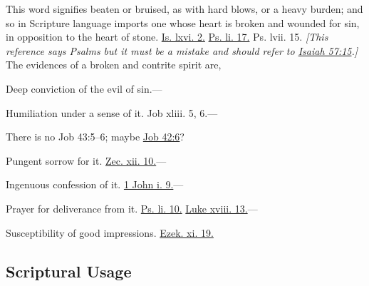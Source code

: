 	\begin{compactdesc}
		\item[250] This word signifies beaten or bruised, as with hard blows, or a heavy burden; and so in Scripture language imports one whose heart is broken and wounded for sin, in opposition to the heart of stone. \hyperref[ISAIAH-66-2]{Is. lxvi. 2.} \hyperref[PSALMS-51-17]{Ps. li. 17.} Ps. lvii. 15. \textit{[This reference says Psalms but it must be a mistake and should refer to \hyperref[ISAIAH-57-15]{Isaiah 57:15}.]} The evidences of a broken and contrite spirit are,
			\begin{compactitem}
				\item Deep conviction of the evil of sin.---
				\item Humiliation under a sense of it. Job xliii. 5, 6.---
					\begin{compactitem}
						\item There is no Job 43:5--6; maybe \hyperref[JOB-42-6]{Job 42:6}?
					\end{compactitem}
				\item Pungent sorrow for it. \hyperref[ZECHARIAH-12-10]{Zec. xii. 10.}---
				\item Ingenuous confession of it. \hyperref[1JOHN-1-9]{1 John i. 9.}---
				\item Prayer for deliverance from it. \hyperref[PSALMS-51-10]{Ps. li. 10.} \hyperref[LUKE-18-13]{Luke xviii. 13.}---
				\item Susceptibility of good impressions. \hyperref[EZEKIEL-11-19]{Ezek. xi. 19.}
			\end{compactitem}
	\end{compactdesc}
	


\subsection{Scriptural Usage} %
	\label{CONTRITE-SCRIPTURES}
	
